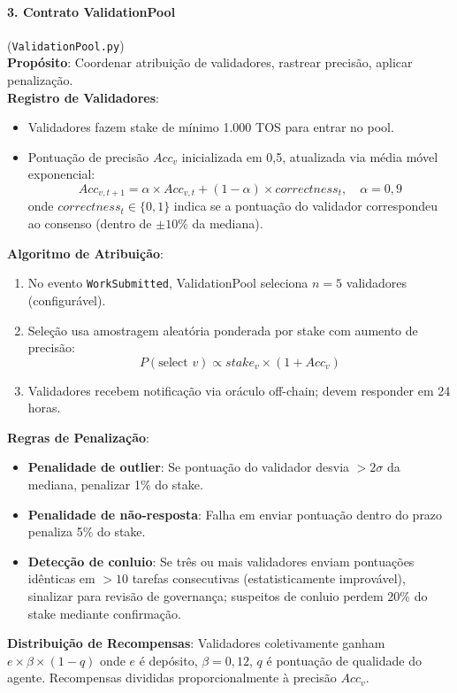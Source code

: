 \documentclass[11pt]{article}
\begin{document}
\paragraph{3. Contrato ValidationPool} (\texttt{ValidationPool.py})\\
\textbf{Propósito}: Coordenar atribuição de validadores, rastrear precisão, aplicar penalização.\\
\textbf{Registro de Validadores}:
\begin{itemize}[noitemsep]
  \item Validadores fazem stake de mínimo 1.000 TOS para entrar no pool.
  \item Pontuação de precisão $Acc_v$ inicializada em 0,5, atualizada via média móvel exponencial:
    \begin{equation}
    Acc_{v,t+1} = \alpha \times Acc_{v,t} + (1-\alpha) \times correctness_t, \quad \alpha = 0,9
    \end{equation}
    onde $correctness_t \in \{0,1\}$ indica se a pontuação do validador correspondeu ao consenso (dentro de $\pm10\%$ da mediana).
\end{itemize}
\textbf{Algoritmo de Atribuição}:
\begin{enumerate}[noitemsep]
  \item No evento \texttt{WorkSubmitted}, ValidationPool seleciona $n=5$ validadores (configurável).
  \item Seleção usa amostragem aleatória ponderada por stake com aumento de precisão:
    \begin{equation}
    P(\text{select } v) \propto stake_v \times (1 + Acc_v)
    \end{equation}
  \item Validadores recebem notificação via oráculo off-chain; devem responder em 24 horas.
\end{enumerate}
\textbf{Regras de Penalização}:
\begin{itemize}[noitemsep]
  \item \textbf{Penalidade de outlier}: Se pontuação do validador desvia $>2\sigma$ da mediana, penalizar 1\% do stake.
  \item \textbf{Penalidade de não-resposta}: Falha em enviar pontuação dentro do prazo penaliza 5\% do stake.
  \item \textbf{Detecção de conluio}: Se três ou mais validadores enviam pontuações idênticas em $>10$ tarefas consecutivas (estatisticamente improvável), sinalizar para revisão de governança; suspeitos de conluio perdem 20\% do stake mediante confirmação.
\end{itemize}
\textbf{Distribuição de Recompensas}: Validadores coletivamente ganham $e \times \beta \times (1-q)$ onde $e$ é depósito, $\beta=0,12$, $q$ é pontuação de qualidade do agente. Recompensas divididas proporcionalmente à precisão $Acc_v$.
\end{document}
